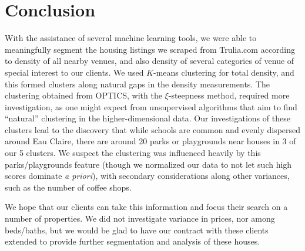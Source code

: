 \documentclass{article}
\begin{document}
\section{Conclusion}
With the assistance of several machine learning tools, we were able to meaningfully segment the housing listings we scraped from Trulia.com according to density of all nearby venues, and also density of several categories of venue of special interest to our clients. We used $K$-means clustering for total density, and this formed clusters along natural gaps in the density measurements. The clustering obtained from OPTICS, with the $\xi$-steepness method, required more investigation, as one might expect from unsupervised algorithms that aim to find ``natural'' clustering in the higher-dimensional data. Our investigations of these clusters lead to the discovery that while schools are common and evenly dispersed around Eau Claire, there are around 20 parks or playgrounds near houses in 3 of our 5 clusters. We suspect the clustering was influenced heavily by this parks/playgrounds feature (though we normalized our data to not let such high scores dominate {\em a priori}), with secondary considerations along other variances, such as the number of coffee shops. 

We hope that our clients can take this information and focus their search on a number of properties. We did not investigate variance in prices, nor among beds/baths, but we would be glad to have our contract with these clients extended to provide further segmentation and analysis of these houses. 
\end{document}
